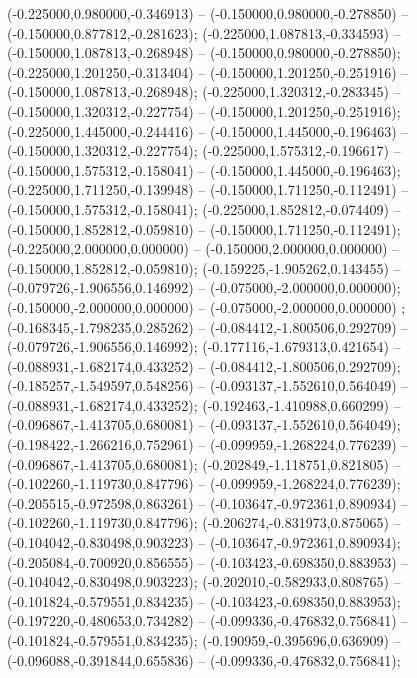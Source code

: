  (-0.225000,0.980000,-0.346913) -- (-0.150000,0.980000,-0.278850) -- (-0.150000,0.877812,-0.281623);
 (-0.225000,1.087813,-0.334593) -- (-0.150000,1.087813,-0.268948) -- (-0.150000,0.980000,-0.278850);
 (-0.225000,1.201250,-0.313404) -- (-0.150000,1.201250,-0.251916) -- (-0.150000,1.087813,-0.268948);
 (-0.225000,1.320312,-0.283345) -- (-0.150000,1.320312,-0.227754) -- (-0.150000,1.201250,-0.251916);
 (-0.225000,1.445000,-0.244416) -- (-0.150000,1.445000,-0.196463) -- (-0.150000,1.320312,-0.227754);
 (-0.225000,1.575312,-0.196617) -- (-0.150000,1.575312,-0.158041) -- (-0.150000,1.445000,-0.196463);
 (-0.225000,1.711250,-0.139948) -- (-0.150000,1.711250,-0.112491) -- (-0.150000,1.575312,-0.158041);
 (-0.225000,1.852812,-0.074409) -- (-0.150000,1.852812,-0.059810) -- (-0.150000,1.711250,-0.112491);
 (-0.225000,2.000000,0.000000) -- (-0.150000,2.000000,0.000000) -- (-0.150000,1.852812,-0.059810);
 (-0.159225,-1.905262,0.143455) -- (-0.079726,-1.906556,0.146992) -- (-0.075000,-2.000000,0.000000);
 (-0.150000,-2.000000,0.000000) -- (-0.075000,-2.000000,0.000000) ;
 (-0.168345,-1.798235,0.285262) -- (-0.084412,-1.800506,0.292709) -- (-0.079726,-1.906556,0.146992);
 (-0.177116,-1.679313,0.421654) -- (-0.088931,-1.682174,0.433252) -- (-0.084412,-1.800506,0.292709);
 (-0.185257,-1.549597,0.548256) -- (-0.093137,-1.552610,0.564049) -- (-0.088931,-1.682174,0.433252);
 (-0.192463,-1.410988,0.660299) -- (-0.096867,-1.413705,0.680081) -- (-0.093137,-1.552610,0.564049);
 (-0.198422,-1.266216,0.752961) -- (-0.099959,-1.268224,0.776239) -- (-0.096867,-1.413705,0.680081);
 (-0.202849,-1.118751,0.821805) -- (-0.102260,-1.119730,0.847796) -- (-0.099959,-1.268224,0.776239);
 (-0.205515,-0.972598,0.863261) -- (-0.103647,-0.972361,0.890934) -- (-0.102260,-1.119730,0.847796);
 (-0.206274,-0.831973,0.875065) -- (-0.104042,-0.830498,0.903223) -- (-0.103647,-0.972361,0.890934);
 (-0.205084,-0.700920,0.856555) -- (-0.103423,-0.698350,0.883953) -- (-0.104042,-0.830498,0.903223);
 (-0.202010,-0.582933,0.808765) -- (-0.101824,-0.579551,0.834235) -- (-0.103423,-0.698350,0.883953);
 (-0.197220,-0.480653,0.734282) -- (-0.099336,-0.476832,0.756841) -- (-0.101824,-0.579551,0.834235);
 (-0.190959,-0.395696,0.636909) -- (-0.096088,-0.391844,0.655836) -- (-0.099336,-0.476832,0.756841);
